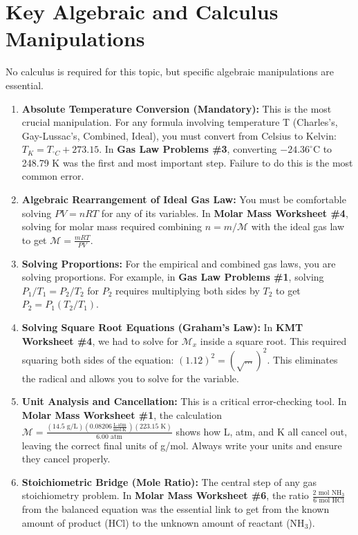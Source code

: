 \documentclass{article}
\begin{document}
\section{Key Algebraic and Calculus Manipulations}
No calculus is required for this topic, but specific algebraic manipulations are essential.
\begin{enumerate}
    \item \textbf{Absolute Temperature Conversion (Mandatory):} This is the most crucial manipulation. For any formula involving temperature T (Charles's, Gay-Lussac's, Combined, Ideal), you must convert from Celsius to Kelvin: $T_K = T_{^{\circ}C} + 273.15$. In \textbf{Gas Law Problems \#3}, converting $-24.36^{\circ}$C to 248.79 K was the first and most important step. Failure to do this is the most common error.
    
    \item \textbf{Algebraic Rearrangement of Ideal Gas Law:} You must be comfortable solving $PV=nRT$ for any of its variables. In \textbf{Molar Mass Worksheet \#4}, solving for molar mass required combining $n=m/\mathcal{M}$ with the ideal gas law to get $\mathcal{M} = \frac{mRT}{PV}$.
    
    \item \textbf{Solving Proportions:} For the empirical and combined gas laws, you are solving proportions. For example, in \textbf{Gas Law Problems \#1}, solving $P_1/T_1 = P_2/T_2$ for $P_2$ requires multiplying both sides by $T_2$ to get $P_2 = P_1(T_2/T_1)$.

    \item \textbf{Solving Square Root Equations (Graham's Law):} In \textbf{KMT Worksheet \#4}, we had to solve for $\mathcal{M}_x$ inside a square root. This required squaring both sides of the equation: $(1.12)^2 = (\sqrt{\dots})^2$. This eliminates the radical and allows you to solve for the variable.
    
    \item \textbf{Unit Analysis and Cancellation:} This is a critical error-checking tool. In \textbf{Molar Mass Worksheet \#1}, the calculation $\mathcal{M} = \frac{(14.5 \text{ g/L})(0.08206 \frac{\text{L} \cdot \text{atm}}{\text{mol} \cdot \text{K}})(223.15 \text{ K})}{6.00 \text{ atm}}$ shows how L, atm, and K all cancel out, leaving the correct final units of g/mol. Always write your units and ensure they cancel properly.
    
    \item \textbf{Stoichiometric Bridge (Mole Ratio):} The central step of any gas stoichiometry problem. In \textbf{Molar Mass Worksheet \#6}, the ratio $\frac{2 \text{ mol NH}_3}{6 \text{ mol HCl}}$ from the balanced equation was the essential link to get from the known amount of product (HCl) to the unknown amount of reactant (NH$_3$).
\end{enumerate}
\end{document}
